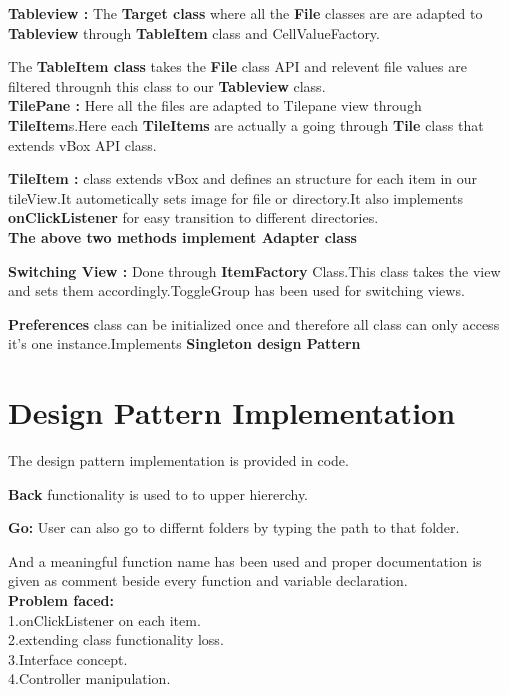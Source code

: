 \documentclass[10pt]{article}
\begin{document}
{\bfseries Tableview :} The {\bfseries Target class} where all the {\bfseries File} classes are are adapted to
{\bfseries  Tableview} through {\bfseries TableItem} class and CellValueFactory.

The {\bfseries TableItem class} takes the {\bfseries File} class API and relevent file values are filtered througnh this class to our {\bfseries  Tableview} class.\\

{\bfseries TilePane :} Here all the files are adapted to Tilepane view through {\bfseries TileItem}s.Here each {\bfseries TileItems} are actually a going through {\bfseries Tile } class that extends vBox API class.

{\bfseries TileItem :} class extends vBox and defines an structure for each item in our tileView.It autometically sets image for file or directory.It also implements {\bfseries onClickListener} for easy transition to different directories.\\

{\bfseries The above two methods implement Adapter class}


{\bfseries Switching View :} Done through {\bfseries ItemFactory} Class.This class takes the view and sets them accordingly.ToggleGroup has been used for switching views.


{\bfseries Preferences } class can be initialized once and therefore all class can only access it's one instance.Implements {\bfseries  Singleton design  Pattern}

\newpage





\section {Design Pattern Implementation}

The design pattern implementation is provided in code.

{\bfseries  Back} functionality is used to to upper hiererchy.

{\bfseries Go:} User can also go to differnt folders by typing the path to  that folder.

And a meaningful function name has been used and proper documentation is given as comment beside every function and variable declaration.\\


{\bfseries Problem faced:}\\
1.onClickListener on each item.\\
2.extending class functionality loss.\\
3.Interface concept.\\
4.Controller manipulation.\\
	
\end{document}
